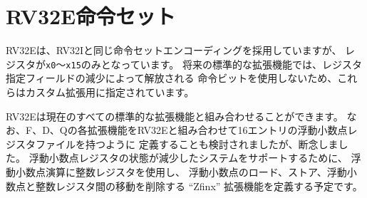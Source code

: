 \section{RV32E命令セット}

\begin{comment}
RV32E uses the same instruction-set encoding as RV32I, except that
only registers {\tt x0}--{\tt x15} are provided.  Any future standard
extensions will not make use of the instruction bits freed up by the
reduced register-specifier fields and so these are designated for
custom extensions.
\end{comment}

RV32Eは、RV32Iと同じ命令セットエンコーディングを採用していますが、
レジスタが{\tt x0}～{\tt x15}のみとなっています。
将来の標準的な拡張機能では、レジスタ指定フィールドの減少によって解放される
命令ビットを使用しないため、これらはカスタム拡張用に指定されています。

\begin{commentary}
\begin{comment}
RV32E can be combined with all current standard extensions. Defining the F, D,
and Q extensions as having a 16-entry floating point register file when
combined with RV32E was considered but decided against. To support
systems with reduced floating-point register state, we intend to
define a ``Zfinx'' extension that makes floating-point computations use the
integer registers, removing the floating-point loads, stores, and moves between
floating point and integer registers.
\end{comment}

RV32Eは現在のすべての標準的な拡張機能と組み合わせることができます。
なお、F、D、Qの各拡張機能をRV32Eと組み合わせて16エントリの浮動小数点レジスタファイルを持つように
定義することも検討されましたが、断念しました。
浮動小数点レジスタの状態が減少したシステムをサポートするために、
浮動小数点演算に整数レジスタを使用し、
浮動小数点のロード、ストア、浮動小数点と整数レジスタ間の移動を削除する ``Zfinx'' 拡張機能を定義する予定です。
\end{commentary}
